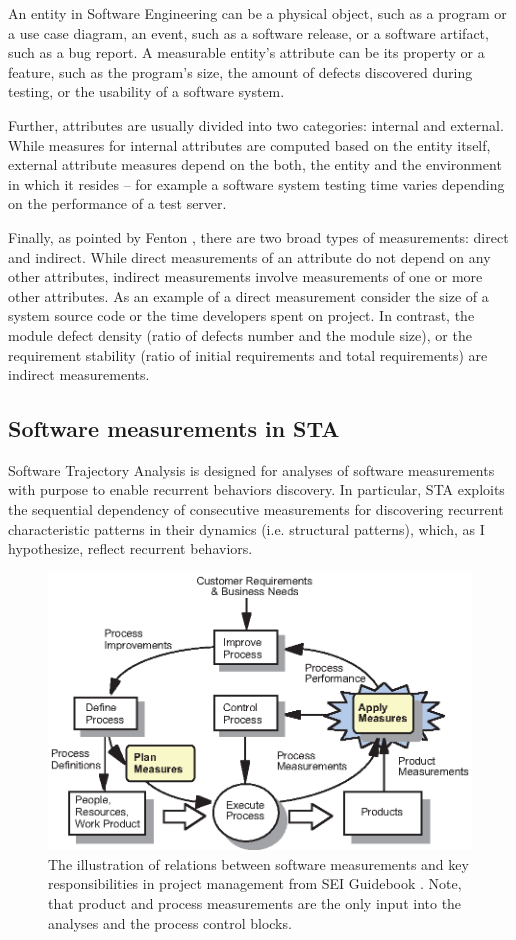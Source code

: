 An entity in Software Engineering can be a physical object, such as a program or a use case diagram, 
an event, such as a software release, or a software artifact, such as a bug report.
A measurable entity's attribute can be its property or a feature, such as the program's size, the 
amount of defects discovered during testing, or the usability of a software system.

Further, attributes are usually divided into two categories: internal and external. 
While measures for internal attributes are computed based on the entity itself, external attribute 
measures depend on the both, the entity and the environment in which it resides -- for example a 
software system testing time varies depending on the performance of a test server.

Finally, as pointed by Fenton \cite{citeulike:1803429}, there are two broad types of measurements: direct
and indirect. While direct measurements of an attribute do not depend on any other attributes, 
indirect measurements involve measurements of one or more other attributes. 
As an example of a direct measurement consider the size of a system source code or the time developers spent 
on project. In contrast, the module defect density (ratio of defects number and the module size), 
or the requirement stability (ratio of initial requirements and total requirements) are indirect measurements.

\subsection{Software measurements in STA}
Software Trajectory Analysis is designed for analyses of software measurements with purpose to enable 
recurrent behaviors discovery. In particular, STA exploits the sequential dependency of consecutive 
measurements for discovering recurrent characteristic patterns in their dynamics (i.e. structural patterns), 
which, as I hypothesize, reflect recurrent behaviors.

\begin{figure}[t]
   \centering
   \includegraphics[width=115mm]{figures/SEI-measurements.eps}
   \caption{The illustration of relations between software measurements and key responsibilities 
   in project management from SEI Guidebook \cite{citeulike:10567306}. Note, that product and process 
   measurements are the only input into the analyses and the process control blocks.}
   \label{fig:sei-measures}
\end{figure}

